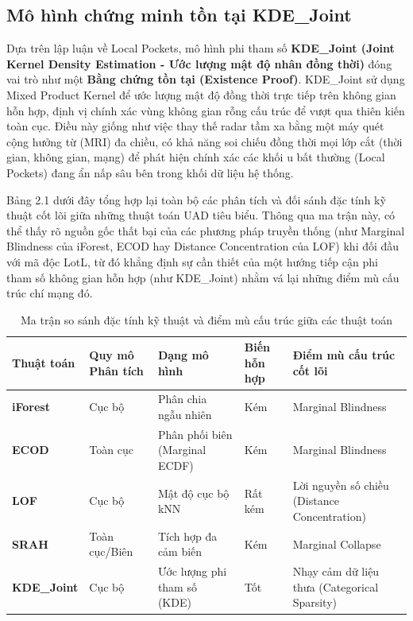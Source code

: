 \documentclass[../main.tex]{subfiles}
\begin{document}
\subsection{Mô hình chứng minh tồn tại KDE\_Joint}
Dựa trên lập luận về Local Pockets, mô hình phi tham số \textbf{KDE\_Joint (Joint Kernel Density Estimation - Ước lượng mật độ nhân đồng thời)} đóng vai trò như một \textbf{Bằng chứng tồn tại (Existence Proof)}. KDE\_Joint sử dụng Mixed Product Kernel để ước lượng mật độ đồng thời trực tiếp trên không gian hỗn hợp, định vị chính xác vùng không gian rỗng cấu trúc để vượt qua thiên kiến toàn cục. Điều này giống như việc thay thế radar tầm xa bằng một máy quét cộng hưởng từ (MRI) đa chiều, có khả năng soi chiếu đồng thời mọi lớp cắt (thời gian, không gian, mạng) để phát hiện chính xác các khối u bất thường (Local Pockets) đang ẩn nấp sâu bên trong khối dữ liệu hệ thống.

Bảng 2.1 dưới đây tổng hợp lại toàn bộ các phân tích và đối sánh đặc tính kỹ thuật cốt lõi giữa những thuật toán UAD tiêu biểu. Thông qua ma trận này, có thể thấy rõ nguồn gốc thất bại của các phương pháp truyền thống (như Marginal Blindness của iForest, ECOD hay Distance Concentration của LOF) khi đối đầu với mã độc LotL, từ đó khẳng định sự cần thiết của một hướng tiếp cận phi tham số không gian hỗn hợp (như KDE\_Joint) nhằm vá lại những điểm mù cấu trúc chí mạng đó.

\begin{table}[H]
\centering
\small
\setlength{\tabcolsep}{4pt}
\caption{Ma trận so sánh đặc tính kỹ thuật và điểm mù cấu trúc giữa các thuật toán}
\label{tab:algorithm_matrix}
\begin{tabular}{|p{1.8cm}|p{1.8cm}|p{3.4cm}|>{\centering\arraybackslash}p{1.2cm}|p{5.0cm}|}
\hline
\textbf{Thuật toán} & \textbf{Quy mô Phân tích} & \textbf{Dạng mô hình} & \textbf{Biến hỗn hợp} & \textbf{Điểm mù cấu trúc cốt lõi} \\ \hline
\textbf{iForest} & Cục bộ & Phân chia ngẫu nhiên & Kém & Marginal Blindness \\ \hline
\textbf{ECOD} & Toàn cục & Phân phối biên (Marginal ECDF) & Kém & Marginal Blindness \\ \hline
\textbf{LOF} & Cục bộ & Mật độ cục bộ kNN & Rất kém & Lời nguyền số chiều (Distance Concentration) \\ \hline
\textbf{SRAH} & Toàn cục/Biên & Tích hợp đa cảm biến & Kém & Marginal Collapse \\ \hline
\textbf{KDE\_Joint} & Cục bộ & Ước lượng phi tham số (KDE) & Tốt & Nhạy cảm dữ liệu thưa (Categorical Sparsity) \\ \hline
\end{tabular}
\end{table}
\end{document}
